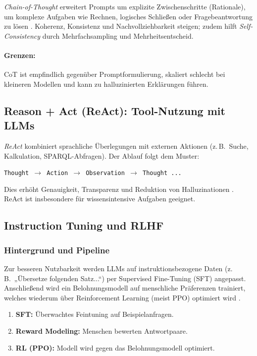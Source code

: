 \emph{Chain-of-Thought} erweitert Prompts um explizite Zwischenschritte (Rationale), um komplexe Aufgaben wie Rechnen, logisches Schließen oder Fragebeantwortung zu lösen \cite{wei2022chain}. Koherenz, Konsistenz und Nachvollziehbarkeit steigen; zudem hilft \emph{Self-Consistency} durch Mehrfachsampling und Mehrheitsentscheid.

\paragraph{Grenzen:} CoT ist empfindlich gegenüber Promptformulierung, skaliert schlecht bei kleineren Modellen und kann zu halluzinierten Erklärungen führen.

\subsection{Reason + Act (ReAct): Tool-Nutzung mit LLMs}

\emph{ReAct} kombiniert sprachliche Überlegungen mit externen Aktionen (z.\,B.\ Suche, Kalkulation, SPARQL-Abfragen). Der Ablauf folgt dem Muster:

\texttt{Thought $\rightarrow$ Action $\rightarrow$ Observation $\rightarrow$ Thought ...}

Dies erhöht Genauigkeit, Transparenz und Reduktion von Halluzinationen \cite{yao2023react}. ReAct ist insbesondere für wissensintensive Aufgaben geeignet.

\subsection{Instruction Tuning und RLHF}

\subsubsection{Hintergrund und Pipeline}

Zur besseren Nutzbarkeit werden LLMs auf instruktionsbezogene Daten (z.\,B.\ „Übersetze folgenden Satz...“) per Supervised Fine-Tuning (SFT) angepasst. Anschließend wird ein Belohnungsmodell auf menschliche Präferenzen trainiert, welches wiederum über Reinforcement Learning (meist PPO) optimiert wird \cite{ouyang2022training}.

\begin{enumerate}
    \item \textbf{SFT:} Überwachtes Feintuning auf Beispielanfragen.
    \item \textbf{Reward Modeling:} Menschen bewerten Antwortpaare.
    \item \textbf{RL (PPO):} Modell wird gegen das Belohnungsmodell optimiert.
\end{enumerate}

